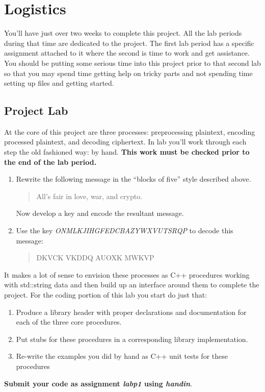 \documentclass[]{tufte-handout}
\begin{document}
\section{Logistics}

You'll have just over two weeks to complete this project. All the lab periods during that time are dedicated to the project. The first lab period has a specific assignment attached to it where the second is time to work and get assistance. You should be putting some serious time into this project prior to that second lab so that you may spend time getting help on tricky parts and not spending time setting up files and getting started. 

\subsection{Project Lab}

At the core of this project are three processes: preprocessing plaintext, encoding processed plaintext, and decoding ciphertext. In lab you'll work through each step the old fashioned way: by hand. \textbf{This work must be checked prior to the end of the lab period.}
\begin{enumerate}
\item Rewrite the following message in the ``blocks of five'' style described above.
\begin{quote}
All's fair in love, war, and crypto.
\end{quote}
Now develop a key and encode the resultant message.
\item Use the key \textit{ONMLKJIHGFEDCBAZYWXVUTSRQP} to decode this message:
\begin{quote}
DKVCK VKDDQ AUOXK MWKVP
\end{quote}
\end{enumerate}


It makes a lot of sense to envision these processes as C++ procedures working with std::string data and then build up an interface around them to complete the project. For the coding portion of this lab you start do just that: 
\begin{enumerate}
\item Produce a library header with proper declarations and documentation for each of the three core procedures.
\item Put stubs for these procedures in a corresponding library implementation.
\item Re-write the examples you did by hand as C++ unit tests for these procedures 
\end{enumerate}
\textbf{Submit your code as assignment \textit{labp1} using \textit{handin}}.
\end{document}
